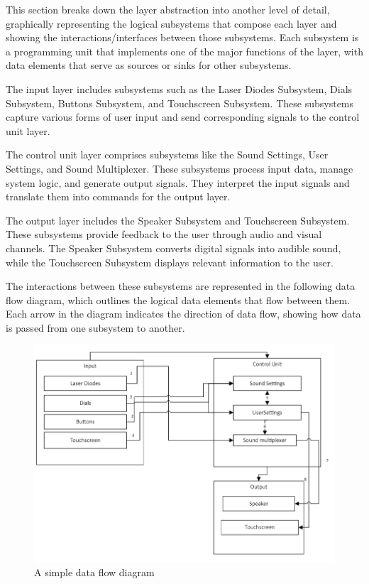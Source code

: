 This section breaks down the layer abstraction into another level of detail, graphically representing the logical subsystems that compose each layer and showing the interactions/interfaces between those subsystems. Each subsystem is a programming unit that implements one of the major functions of the layer, with data elements that serve as sources or sinks for other subsystems.

The input layer includes subsystems such as the Laser Diodes Subsystem, Dials Subsystem, Buttons Subsystem, and Touchscreen Subsystem. These subsystems capture various forms of user input and send corresponding signals to the control unit layer.

The control unit layer comprises subsystems like the Sound Settings, User Settings, and Sound Multiplexer. These subsystems process input data, manage system logic, and generate output signals. They interpret the input signals and translate them into commands for the output layer.

The output layer includes the Speaker Subsystem and Touchscreen Subsystem. These subsystems provide feedback to the user through audio and visual channels. The Speaker Subsystem converts digital signals into audible sound, while the Touchscreen Subsystem displays relevant information to the user.

The interactions between these subsystems are represented in the following data flow diagram, which outlines the logical data elements that flow between them. Each arrow in the diagram indicates the direction of data flow, showing how data is passed from one subsystem to another.
\begin{figure}[h!]
	\centering
 	\includegraphics[width=\textwidth]{images/Subsystem}
 \caption{A simple data flow diagram}
\end{figure}
